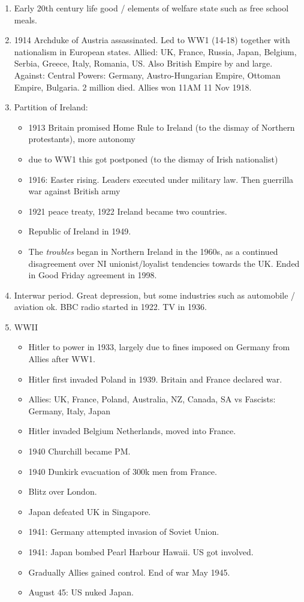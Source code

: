 \documentclass{amsart}
\begin{document}
\begin{enumerate}
\item Early 20th century life good / elements of welfare state such as free school meals. 
\item 1914 Archduke of Austria assassinated. Led to WW1 (14-18) together with nationalism in European states. 
Allied: UK, France, Russia, Japan, Belgium, Serbia, Greece, Italy, Romania, US. 
Also British Empire by and large. 
Against: Central Powers: Germany, Austro-Hungarian Empire, Ottoman Empire, Bulgaria.
2 million died. Allies won 11AM 11 Nov 1918.
\item Partition of Ireland:
	\begin{itemize}
		\item 1913 Britain promised Home Rule to Ireland (to the dismay of Northern protestants), more autonomy
		\item due to WW1 this got postponed (to the dismay of Irish nationalist)
		\item 1916: Easter rising. Leaders executed under military law. Then guerrilla war against British army
		\item 1921 peace treaty, 1922 Ireland became two countries. 
		\item Republic of Ireland in 1949.
		\item The \textit{troubles} began in Northern Ireland in the 1960s, as a continued disagreement over NI unionist/loyalist tendencies towards the UK. Ended in Good Friday agreement in 1998. 
	\end{itemize}
\item Interwar period. Great depression, but some industries such as automobile / aviation ok. BBC radio started in 1922. TV in 1936.
\item WWII 
		\begin{itemize}
			\item Hitler to power in 1933, largely due to fines imposed on Germany from Allies after WW1. 
			\item Hitler first invaded Poland  in 1939. Britain and France declared war. 
			\item Allies: UK, France, Poland, Australia, NZ, Canada, SA vs Fascists: Germany, Italy, Japan
			\item Hitler invaded Belgium Netherlands, moved into France. 
			\item 1940 Churchill became PM. 
			\item 1940 Dunkirk evacuation of 300k men from France.
			\item Blitz over London.
			\item Japan defeated UK in Singapore.
			\item 1941: Germany attempted invasion of Soviet Union. 
			\item 1941: Japan bombed Pearl Harbour Hawaii. US got involved. 
			\item Gradually Allies gained control. End of war May 1945. 
			\item August 45: US nuked Japan. 
		\end{itemize}
\end{enumerate}
\end{document}
